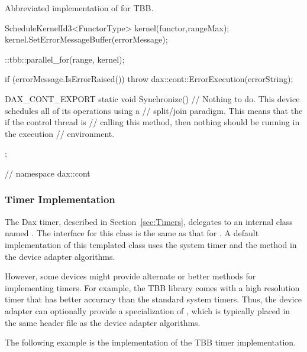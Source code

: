\begin{daxexample}{Abbreviated implementation of  for TBB.}
{{{{    ScheduleKernelId3<FunctorType> kernel(functor,rangeMax);
    kernel.SetErrorMessageBuffer(errorMessage);

    ::tbb::parallel_for(range, kernel);

    if (errorMessage.IsErrorRaised())
      {
      throw dax::cont::ErrorExecution(errorString);
      }
  }

  DAX_CONT_EXPORT static void Synchronize()
  {
    // Nothing to do. This device schedules all of its operations using a
    // split/join paradigm. This means that the if the control thread is
    // calling this method, then nothing should be running in the execution
    // environment.
  }

};

}
} // namespace dax::cont
\end{daxexample}


\subsubsection{Timer Implementation}

The Dax timer, described in Section~\ref{sec:Timers}, delegates to an
internal class named . The
interface for this class is the same as that for . A default
implementation of this templated class uses the system timer and the
 method in the device adapter algorithms.

However, some devices might provide alternate or better methods for
implementing timers. For example, the TBB library comes with a high
resolution timer that has better accuracy than the standard system
timers. Thus, the device adapter can optionally provide a specialization of
, which is typically
placed in the same header file as the device adapter algorithms.

The following example is the implementation of the TBB timer
implementation.

